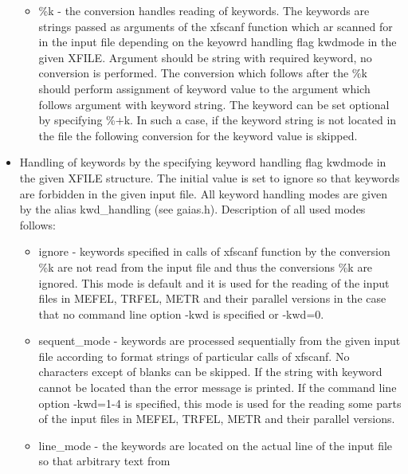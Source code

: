\begin{itemize}
\begin {itemize}
       \item {\sf \textquotedbl\%k\textquotedbl} - the conversion handles reading of keywords. The keywords 
        are strings passed as arguments of the xfscanf function which ar scanned for in the input file depending 
        on the keyowrd handling flag {\sf kwdmode} in the given {\sf XFILE}. Argument should be string with required 
        keyword, no conversion is performed. The conversion which follows after the {\sf \textquotedbl\%k\textquotedbl} 
        should perform assignment of keyword value to the argument which follows argument with keyword string.
        The keyword can be set optional by specifying {\sf \textquotedbl\%+k\textquotedbl}. In such a case, if the
        keyword string is not located in the file the following conversion for the keyword value is skipped.
        \end{itemize}
\item Handling of keywords by the specifying keyword handling flag {\sf kwdmode} in the given {\sf XFILE} structure. The 
      initial value is set to {\sf ignore} so that keywords are forbidden in the given input file. All keyword handling modes 
      are given by the alias {\sf kwd\_handling} (see {\sf gaias.h}). Description of all used modes follows:
      \begin{itemize}
      \item {\sf ignore} - keywords specified in calls of {\sf xfscanf} function by the conversion {\sf \textquotedbl\%k\textquotedbl} are not read from the 
                          input file and thus the conversions {\sf \textquotedbl\%k\textquotedbl} are ignored.
                          This mode is default and it is used for the reading of the input files in MEFEL, TRFEL, METR 
                          and their parallel versions in the case that no command line option -kwd is specified or -kwd=0.
      \item {\sf sequent\_mode} - keywords are processed sequentially from the given input file according to format strings
                                of particular calls of {\sf xfscanf}. No characters except of blanks can be skipped. If the
                                string with keyword cannot be located than the error message is printed. 
                                If the command line option -kwd=1-4 is specified, this mode is used for the reading some 
                                parts of the input files in MEFEL, TRFEL, METR and their parallel versions.
      \item {\sf line\_mode} - the keywords are located on the actual line of the input file so that arbitrary text from

\end{itemize}
\end{itemize}
